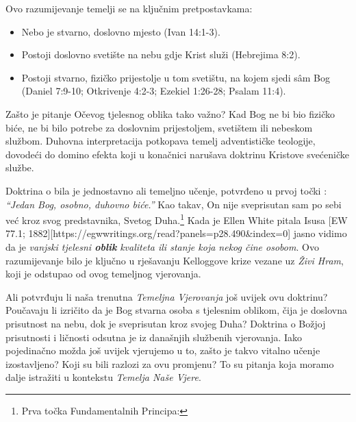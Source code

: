 Ovo razumijevanje temelji se na ključnim pretpostavkama:
\begin{itemize}
    \item Nebo je stvarno, doslovno mjesto (Ivan 14:1-3).
    \item Postoji doslovno svetište na nebu gdje Krist služi (Hebrejima 8:2).
    \item Postoji stvarno, fizičko prijestolje u tom svetištu, na kojem sjedi sâm Bog (Daniel 7:9-10; Otkrivenje 4:2-3; Ezekiel 1:26-28; Psalam 11:4).
\end{itemize}

Zašto je pitanje Očevog tjelesnog oblika tako važno? Kad Bog ne bi bio fizičko biće, ne bi bilo potrebe za doslovnim prijestoljem, svetištem ili nebeskom službom. Duhovna interpretacija potkopava temelj adventističke teologije, dovodeći do domino efekta koji u konačnici narušava doktrinu Kristove svećeničke službe.

Doktrina o  bila je jednostavno ali temeljno učenje, potvrđeno u prvoj točki : \textit{“Jedan Bog, osobno, duhovno biće.”} Kao takav, On nije sveprisutan sam po sebi već kroz svog predstavnika, Svetog Duha.\footnote{Prva točka Fundamentalnih Principa: } Kada je Ellen White pitala Isusa [EW 77.1; 1882][https://egwwritings.org/read?panels=p28.490&index=0] jasno vidimo da je \textit{vanjski tjelesni \textbf{oblik}} \textit{kvaliteta ili stanje koja nekog čine osobom}. Ovo razumijevanje bilo je ključno u rješavanju Kelloggove krize vezane uz \textit{Živi Hram}, koji je odstupao od ovog temeljnog vjerovanja.

Ali potvrđuju li naša trenutna \textit{Temeljna Vjerovanja} još uvijek ovu doktrinu? Poučavaju li izričito da je Bog stvarna osoba s tjelesnim oblikom, čija je doslovna prisutnost na nebu, dok je sveprisutan kroz svojeg Duha? Doktrina o Božjoj prisutnosti i ličnosti odsutna je iz današnjih službenih vjerovanja. Iako pojedinačno možda još uvijek vjerujemo u to, zašto je takvo vitalno učenje izostavljeno? Koji su bili razlozi za ovu promjenu? To su pitanja koja moramo dalje istražiti u kontekstu \textit{Temelja Naše Vjere}.

